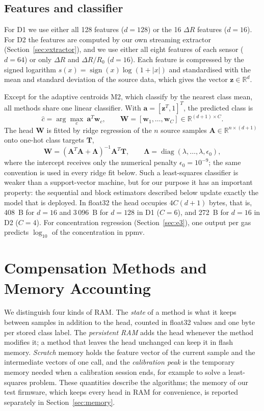 \documentclass[journal,twoside,web]{ieeecolor}
\begin{document}
\subsection{Features and classifier}
For D1 we use either all 128 features ($d=128$) or the 16 $\Delta R$ features ($d=16$). For D2 the features are computed by our own streaming extractor (Section~\ref{sec:extractor}), and we use either all eight features of each sensor ($d=64$) or only $\Delta R$ and $\Delta R/R_0$ ($d=16$). Each feature is compressed by the signed logarithm $s(x)=\operatorname{sign}(x)\log(1+|x|)$ and standardised with the mean and standard deviation of the source data, which gives the vector $\boldsymbol z\in\mathbb R^d$.

Except for the adaptive centroids M2, which classify by the nearest class mean, all methods share one linear classifier. With $\boldsymbol a=[\boldsymbol z^T,1]^T$, the predicted class is
\begin{equation}
\hat c=\arg\max_{c}\ \boldsymbol a^T\boldsymbol w_c,\qquad \boldsymbol W=[\boldsymbol w_1,\dots,\boldsymbol w_C]\in\mathbb R^{(d+1)\times C}.
\label{eq:head}
\end{equation}
The head $\boldsymbol W$ is fitted by ridge regression of the $n$ source samples $\boldsymbol A\in\mathbb R^{n\times(d+1)}$ onto one-hot class targets $\boldsymbol T$,
\begin{equation}
\boldsymbol W=(\boldsymbol A^T\boldsymbol A+\boldsymbol\Lambda)^{-1}\boldsymbol A^T\boldsymbol T,\qquad \boldsymbol\Lambda=\operatorname{diag}(\lambda,\dots,\lambda,\epsilon_0),
\label{eq:ridge}
\end{equation}
where the intercept receives only the numerical penalty $\epsilon_0=10^{-9}$; the same convention is used in every ridge fit below. Such a least-squares classifier is weaker than a support-vector machine, but for our purpose it has an important property: the sequential and block estimators described below update exactly the model that is deployed. In float32 the head occupies $4C(d+1)$ bytes, that is, 408~B for $d=16$ and 3\,096~B for $d=128$ in D1 ($C=6$), and 272~B for $d=16$ in D2 ($C=4$). For concentration regression (Section~\ref{sec:e3}), one output per gas predicts $\log_{10}$ of the concentration in ppmv.

\section{Compensation Methods and Memory Accounting}
\label{sec:methods}
We distinguish four kinds of RAM. The \emph{state} of a method is what it keeps between samples in addition to the head, counted in float32 values and one byte per stored class label. The \emph{persistent RAM} adds the head whenever the method modifies it; a method that leaves the head unchanged can keep it in flash memory. \emph{Scratch} memory holds the feature vector of the current sample and the intermediate vectors of one call, and the \emph{calibration peak} is the temporary memory needed when a calibration session ends, for example to solve a least-squares problem. These quantities describe the algorithms; the memory of our test firmware, which keeps every head in RAM for convenience, is reported separately in Section~\ref{sec:memory}.
\end{document}
